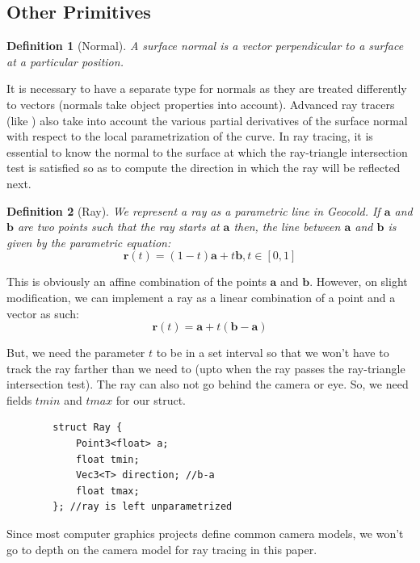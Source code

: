 \documentclass[a4paper, 12pt]{article}
\newcommand\PROJECTNAME{Geocold}
\newtheorem{definition}{Definition}
\begin{document}
\subsection{Other Primitives}
\begin{definition}[Normal]
	A surface normal is a vector perpendicular to a surface at a 
	particular position.
\end{definition}

It is necessary to have a separate type for normals as 
they are treated differently to vectors (normals take 
object properties into account). Advanced ray tracers 
(like \cite{pbrt}) also take into account the various
partial derivatives of the surface normal with respect
to the local parametrization of the curve. In 
ray tracing, it is essential to know the normal 
to the surface at which the ray-triangle 
intersection test is satisfied so as to 
compute the direction in which the ray will be reflected next.

\begin{definition}[Ray]
	We represent a ray as a parametric line in \PROJECTNAME.
	If $\bm{a}$ and $\bm{b}$ are two points such that 
	the ray starts at $\bm{a}$ then, the line between 
	$\bm{a}$ and $\bm{b}$ is given by the parametric equation: 
	\begin{equation}
		\bm{r}(t) = (1-t)\bm{a} + t\bm{b}, t\in [0,1]
	\end{equation}
\end{definition}
	This is obviously an affine combination of the points $\bm{a}$ and $\bm{b}$.
	However, on slight modification, we can implement a ray 
	as a linear combination of a point and a vector as such:
	\begin{equation}
		\bm{r}(t) = \bm{a} + t(\bm{b}-\bm{a})
	\end{equation}

	But, we need the parameter $t$ to be in a set interval so
	that we won't have to track the ray farther than we need to
	(upto when the ray passes the ray-triangle intersection test).
	The ray can also not go behind the camera or eye.
	So, we need fields $tmin$ and $tmax$ for our struct.

	\begin{lstlisting}
		struct Ray {
			Point3<float> a;
			float tmin;
			Vec3<T> direction; //b-a
			float tmax;
		}; //ray is left unparametrized
	\end{lstlisting}

	Since most computer graphics projects
	define common camera models, we won't go
	to depth on the camera model for ray tracing in 
	this paper. 
\end{document}
